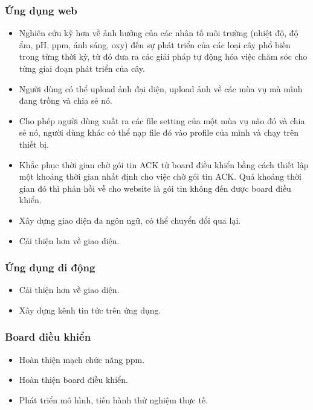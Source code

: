 \documentclass[a4paper,12pt,oneside]{article}
\begin{document}
\subsubsection{Ứng dụng web}
\begin{itemize}
\item Nghiên cứu kỹ hơn về ảnh hưởng của các nhân tố môi trường (nhiệt độ, độ ẩm, pH, ppm, ánh sáng, oxy) đến sự phát triển của các loại cây phổ biến trong từng thời kỳ, từ đó đưa ra các giải pháp tự động hóa việc chăm sóc cho từng giai đoạn phát triển của cây.
\item Người dùng có thể upload ảnh đại diện, upload ảnh về các mùa vụ mà mình đang trồng và chia sẻ nó.
\item Cho phép người dùng xuất ra các file setting của một mùa vụ nào đó và chia sẻ nó, người dùng khác có thể nạp file đó vào profile của mình và chạy trên thiết bị.
\item Khắc phục thời gian chờ gói tin ACK từ board điều khiển bằng cách thiết lập một khoảng thời gian nhất định cho việc chờ gói tin ACK. Quá khoảng thời gian đó thì phản hồi về cho website là gói tin không đến được board điều khiển.
\item Xây dựng giao diện đa ngôn ngữ, có thể chuyển đổi qua lại.
\item Cải thiện hơn về giao diện.
\end{itemize}

\subsubsection{Ứng dụng di động}
\begin{itemize}
\item Cải thiện hơn về giao diện.
\item Xây dựng kênh tin tức trên ứng dụng.
\end{itemize}

\subsubsection{Board điều khiển}
\begin{itemize}
\item Hoàn thiện mạch chức năng ppm.
\item Hoàn thiện board điều khiển.
\item Phát triển mô hình, tiến hành thử nghiệm thực tế.
\end{itemize}
\newpage
\end{document}
